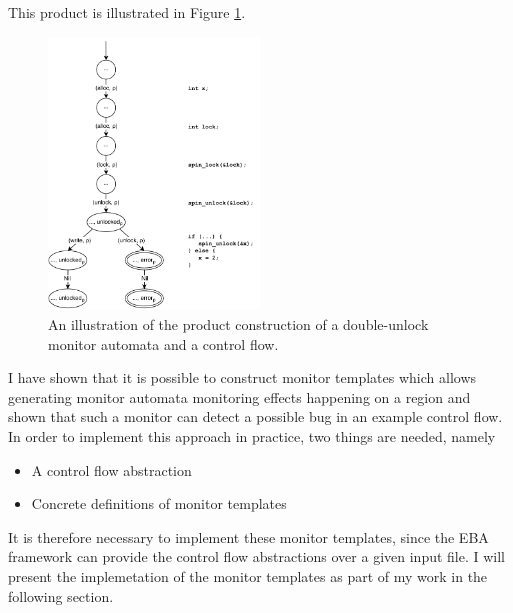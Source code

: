 \noindent This product is illustrated in Figure \ref{cfg_unlock-product}. 

\begin{figure}[H]
    \centering
    \includegraphics[width=0.5\textwidth]{algorithm/figures/cfg_unlock-product}
    \caption{An illustration of the product construction of a double-unlock monitor automata and a control flow.}
    \label{cfg_unlock-product}
\end{figure}

\newpar I have shown that it is possible to construct monitor templates which allows generating monitor automata monitoring effects happening on a region and shown that such a monitor can detect a possible bug in an example control flow. In order to implement this approach in practice, two things are needed, namely

\begin{itemize}
    \item A control flow abstraction
    \item Concrete definitions of monitor templates
\end{itemize}

\noindent It is therefore necessary to implement these monitor templates, since the EBA framework can provide the control flow abstractions over a given input file. I will present the implemetation of the monitor templates as part of my work in the following section. 